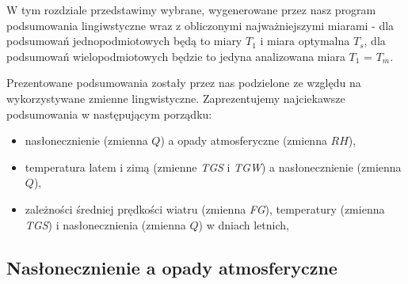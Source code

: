 \documentclass{classrep}
\begin{document}
W tym rozdziale przedstawimy wybrane, wygenerowane przez nasz program podsumowania lingiwstyczne wraz z obliczonymi najważniejszymi miarami - dla podsumowań jednopodmiotowych będą to miary $T_1$ i miara optymalna $T_s$, dla podsumowań wielopodmiotowych będzie to jedyna analizowana miara $T_1$ = $T_m$.\newline

Prezentowane podsumowania zostały przez nas podzielone ze względu na wykorzystywane zmienne lingwistyczne. Zaprezentujemy najciekawsze podsumowania w następującym porządku:

\begin{itemize}[label=$\bullet$\scshape\bfseries]
\item nasłonecznienie (zmienna $Q$) a opady atmosferyczne (zmienna $RH$),
\item temperatura latem i zimą (zmienne \textit{TGS} i \textit{TGW}) a nasłonecznienie (zmienna $Q$),
\item zależności średniej prędkości wiatru (zmienna \textit{FG}), temperatury (zmienna \textit{TGS}) i nasłonecznienia (zmienna $Q$) w dniach letnich,
\end{itemize}

\clearpage

\subsection{Nasłonecznienie a opady atmosferyczne}
\end{document}
